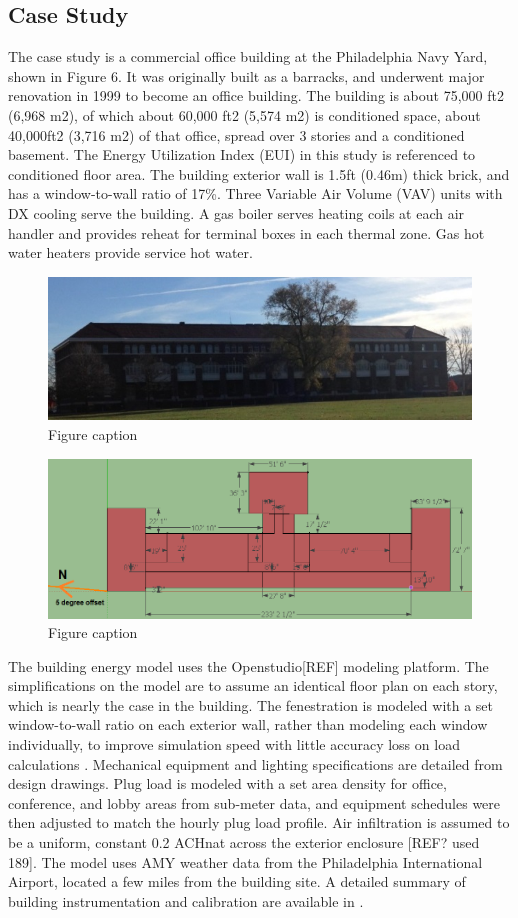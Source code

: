 \documentclass[review]{elsarticle}
\begin{document}
\subsection{Case Study}
The case study is a commercial office building at the Philadelphia Navy Yard, shown in Figure 6. It was originally built as a barracks, and underwent major renovation in 1999 to become an office building. The building is about 75,000 ft2 (6,968 m2), of which about 60,000 ft2 (5,574 m2) is conditioned space, about 40,000ft2 (3,716 m2) of that office, spread over 3 stories and a conditioned basement. The Energy Utilization Index (EUI) in this study is referenced to conditioned floor area.  The building exterior wall is 1.5ft (0.46m) thick brick, and has a window-to-wall ratio of 17\%.  Three Variable Air Volume (VAV) units with DX cooling serve the building. A gas boiler serves heating coils at each air handler and provides reheat for terminal boxes in each thermal zone. Gas hot water heaters provide service hot water.\par
\begin{figure}[h]
	\centering\includegraphics[width=0.4\linewidth]{Bldg101photo.jpg}
	\caption{Figure caption}
\end{figure}
\begin{figure}[h]
	\centering\includegraphics[width=0.4\linewidth]{Bldg101layout.png}
	\caption{Figure caption}
\end{figure}
The building energy model uses the Openstudio[REF] modeling platform.  The simplifications on the model are to assume an identical floor plan on each story, which is nearly the case in the building.  The fenestration is modeled with a set window-to-wall ratio on each exterior wall, rather than modeling each window individually, to improve simulation speed with little accuracy loss on load calculations \cite{Liu2011409}.  Mechanical equipment and lighting specifications are detailed from design drawings.  Plug load is modeled with a set area density for office, conference, and lobby areas from sub-meter data, and equipment schedules were then adjusted to match the hourly plug load profile\cite{Delgoshaei2013, Xu2012}.  Air infiltration is assumed to be a uniform, constant 0.2 ACHnat across the exterior enclosure [REF? used 189]. The model uses AMY weather data from the Philadelphia International Airport, located a few miles from the building site. A detailed summary of building instrumentation and calibration are available in \cite{Dasgupta2012, Dahlhausen2014}.    
\end{document}
